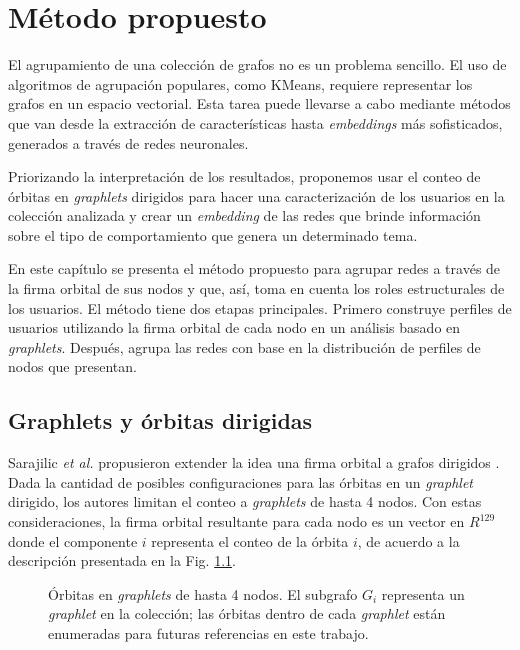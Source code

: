 %
\chapter{Método propuesto}
\label{chapter:4}


El agrupamiento de una colección de grafos no es un problema sencillo. El uso de algoritmos de agrupación populares, como KMeans, requiere representar los grafos en un espacio vectorial. Esta tarea puede llevarse a cabo mediante métodos que van desde la extracción de características hasta \textit{embeddings} más sofisticados, generados a través de redes neuronales. 

Priorizando la interpretación de los resultados, proponemos usar el conteo de órbitas en \textit{graphlets} dirigidos para hacer una caracterización de los usuarios en la colección analizada y crear un \textit{embedding} de las redes que brinde información sobre el tipo de comportamiento que genera un determinado tema. 

En este capítulo se presenta el método propuesto para agrupar redes a través de la firma orbital de sus nodos y que, así, toma en cuenta los roles estructurales de los usuarios. El método tiene dos etapas principales. Primero construye perfiles de usuarios utilizando la firma orbital de cada nodo en un análisis basado en \textit{graphlets}. Después, agrupa las redes con base en la distribución de perfiles de nodos que presentan. 

\section{Graphlets y órbitas dirigidas}
Sarajilic \textit{et al.} propusieron extender la idea una firma orbital a grafos dirigidos \cite{sarajlic_graphlet-based_2016}. Dada la cantidad de posibles configuraciones para las órbitas en un \textit{graphlet} dirigido, los autores limitan el conteo a \textit{graphlets} de hasta 4 nodos. Con estas consideraciones, la firma orbital resultante para cada nodo es un vector en $R^{129}$ donde el componente $i$ representa el conteo de la órbita $i$, de acuerdo a la descripción presentada en la Fig. \ref{fig:orbits}.

 \begin{figure}[htbp]
   \centering
   
    \caption{Órbitas en \textit{graphlets} de hasta 4 nodos. El subgrafo $G_i$ representa un \textit{graphlet} en la colección; las órbitas dentro de cada \textit{graphlet} están enumeradas para futuras referencias en este trabajo. }
    \label{fig:orbits}
\end{figure}


